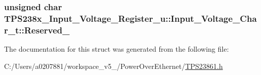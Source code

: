 \hypertarget{struct_t_p_s238x___input___voltage___register__u_1_1_input___voltage___char__t_a50e3c4b78f4d81f0ff024dceaa5b062f}{
\subsubsection[{Reserved\-\_\-13}]{\setlength{\rightskip}{0pt plus 5cm}unsigned char T\-P\-S238x\-\_\-\-Input\-\_\-\-Voltage\-\_\-\-Register\-\_\-u\-::\-Input\-\_\-\-Voltage\-\_\-\-Char\-\_\-t\-::\-Reserved\-\_}}\label{struct_t_p_s238x___input___voltage___register__u_1_1_input___voltage___char__t_a50e3c4b78f4d81f0ff024dceaa5b062f}


The documentation for this struct was generated from the following file\-:\begin{DoxyCompactItemize}
\item 
C\-:/\-Users/a0207881/workspace\-\_\-v5\-\_/\-Power\-Over\-Ethernet/\hyperlink{_t_p_s23861_8h}{T\-P\-S23861.\-h}\end{DoxyCompactItemize}
